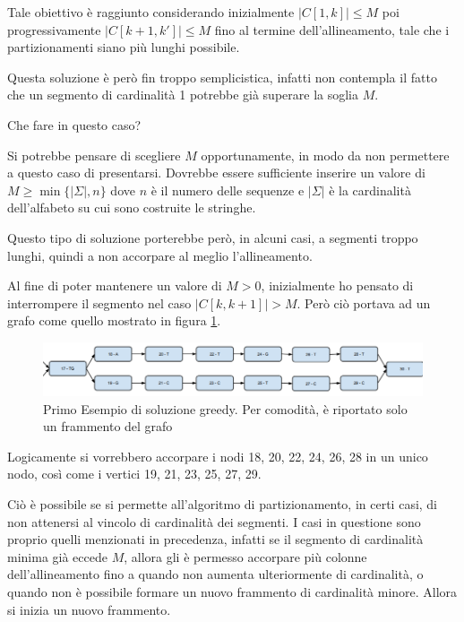 Tale obiettivo è raggiunto considerando inizialmente $|C[1,k]| \leq M$ poi progressivamente $|C[k+1,k']| \leq M$ fino al termine dell'allineamento, tale che i partizionamenti siano più lunghi possibile.

Questa soluzione è però fin troppo semplicistica, infatti non contempla il fatto che un segmento di cardinalità 1 potrebbe già superare la soglia $M$. 

Che fare in questo caso?

Si potrebbe pensare di scegliere $M$ opportunamente, in modo da non permettere a questo caso di presentarsi. Dovrebbe essere sufficiente inserire un valore di $M \geq \min \{|\Sigma|,n\}$ dove $n$ è il numero delle sequenze e $|\Sigma|$ è la cardinalità dell'alfabeto su cui sono costruite le stringhe.

Questo tipo di soluzione porterebbe però, in alcuni casi, a segmenti troppo lunghi, quindi a non accorpare al meglio l'allineamento.

Al fine di poter mantenere un valore di $M>0$, inizialmente ho pensato di interrompere il segmento nel caso $|C[k,k+1]| > M$. Però ciò portava ad un grafo come quello mostrato in figura \ref{fig:primo_esempio_splicing_graph_greedy}.

\begin{figure}[ht]
    \centering
    \includegraphics[scale=0.7]{images/greedy1.PNG}
    \caption{Primo Esempio di soluzione greedy. Per comodità, è riportato solo un frammento del grafo}
    \label{fig:primo_esempio_splicing_graph_greedy}
\end{figure}

Logicamente si vorrebbero accorpare i nodi 18, 20, 22, 24, 26, 28 in un unico nodo, così come i vertici 19, 21, 23, 25, 27, 29.

Ciò è possibile se si permette all'algoritmo di partizionamento, in certi casi, di non attenersi al vincolo di cardinalità dei segmenti. I casi in questione sono proprio quelli menzionati in precedenza, infatti se il segmento di cardinalità minima già eccede $M$, allora gli è permesso accorpare più colonne dell'allineamento fino a quando non aumenta ulteriormente di cardinalità, o quando non è possibile formare un nuovo frammento di cardinalità minore. Allora si inizia un nuovo frammento.

